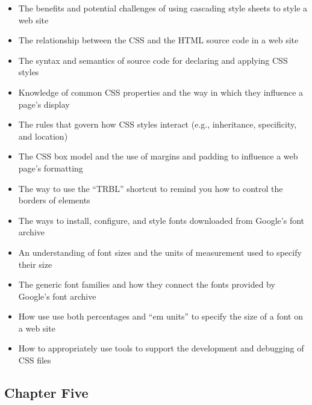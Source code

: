 \documentclass[11pt]{article}
\begin{document}
\begin{itemize}

  \itemsep 0in

  \item The benefits and potential challenges of using cascading style sheets to
    style a web site
  \item The relationship between the CSS and the HTML source code in a web site
  \item The syntax and semantics of source code for declaring and applying CSS
    styles
  \item Knowledge of common CSS properties and the way in which they influence
    a page's display
  \item The rules that govern how CSS styles interact (e.g., inheritance,
    specificity, and location)
  \item The CSS box model and the use of margins and padding to influence a web
    page's formatting
  \item The way to use the ``TRBL'' shortcut to remind you how to control the
    borders of elements
  \item The ways to install, configure, and style fonts downloaded from Google's
    font archive
  \item An understanding of font sizes and the units of measurement used to
    specify their size
  \item The generic font families and how they connect the fonts provided by
    Google's font archive
  \item How use use both percentages and ``em units'' to specify the size of a
    font on a web site
  \item How to appropriately use tools to support the development and
    debugging of CSS files

\end{itemize}

\vspace*{-.2in}
\subsection*{Chapter Five}
\end{document}
